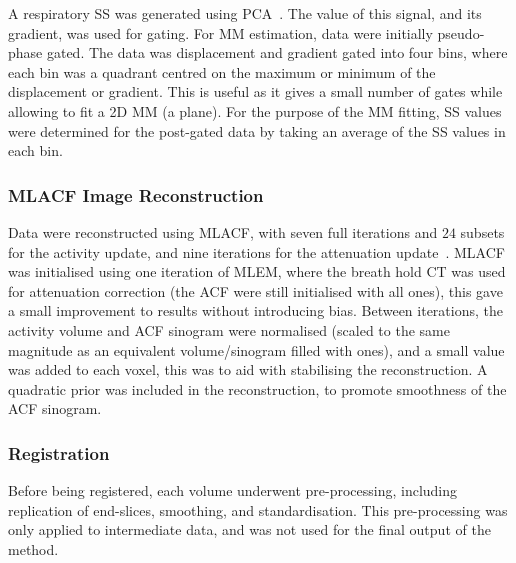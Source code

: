                 A respiratory \gls{SS} was generated using \gls{PCA}~\parencite{Thielemans2011}. The value of this signal, and its gradient, was used for gating. For \gls{MM} estimation, data were initially pseudo-phase gated. The data was displacement and gradient gated into four bins, where each bin was a quadrant centred on the maximum or minimum of the displacement or gradient. This is useful as it gives a small number of gates while allowing to fit a \gls{2D} \gls{MM} (a plane). For the purpose of the \gls{MM} fitting, \gls{SS} values were determined for the post-gated data by taking an average of the \gls{SS} values in each bin.
                
            \subsubsection{MLACF Image Reconstruction} \label{sec:pet_ct_motion_correction_exploiting_motion_models_fit_on_coarsely_gated_data_applied_to_finely_gated_data_methods_mlacf_image_reconstruction}
                Data were reconstructed using \gls{MLACF}, with seven full iterations and $24$ subsets for the activity update, and nine iterations for the attenuation update~\parencite{Nuyts2012ML-reconstructionFactors}. \gls{MLACF} was initialised using one iteration of \gls{MLEM}, where the breath hold \gls{CT} was used for attenuation correction (the \gls{ACF} were still initialised with all ones), this gave a small improvement to results without introducing bias. Between iterations, the activity volume and \gls{ACF} sinogram were normalised (scaled to the same magnitude as an equivalent volume/sinogram filled with ones), and a small value was added to each voxel, this was to aid with stabilising the reconstruction. A quadratic prior was included in the reconstruction, to promote smoothness of the \gls{ACF} sinogram.
            
            \subsubsection{Registration} \label{sec:pet_ct_motion_correction_exploiting_motion_models_fit_on_coarsely_gated_data_applied_to_finely_gated_data_methods_registration}
                Before being registered, each volume underwent pre-processing, including replication of end-slices, smoothing, and standardisation. This pre-processing was only applied to intermediate data, and was not used for the final output of the method.
                
